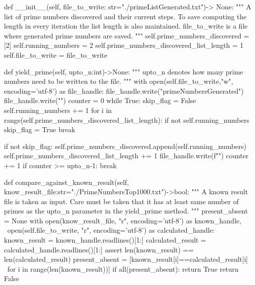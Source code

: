 \documentclass[10pt, twoside]{article}
\begin{document}
\begin{appendices}
\begin{python}
    def __init__(self, file_to_write: str="./primeListGenerated.txt")-> None:
        """
        A list of prime numbers discovered and their current steps. 
        To save computing the length in every iteration the list length is also maintained.
        file_to_write is a file where generated prime numbers are saved.
        """
        self.prime_numbers_discovered = [2]
        self.running_numbers = 2
        self.prime_numbers_discovered_list_length = 1
        self.file_to_write = file_to_write

    def yield_prime(self, upto_n:int)->None:
        """
        upto_n denotes how many prime numbers need to be written to the file.
        """
        with open(self.file_to_write,"w", encoding='utf-8') as file_handle:
            file_handle.write("primeNumbersGenerated")
            file_handle.write("")
            counter = 0
            while True:
                skip_flag = False
                self.running_numbers += 1
                for i in range(self.prime_numbers_discovered_list_length):
                    if not self.running_numbers%
                        skip_flag = True
                        break

                if not skip_flag:
                    self.prime_numbers_discovered.append(self.running_numbers)
                    self.prime_numbers_discovered_list_length += 1
                    file_handle.write(f"")
                    counter += 1
                if counter >= upto_n-1:
                    break

    def compare_against_known_result(self, know_result_file:str="./PrimeNumbersTop1000.txt")->bool:
        """
        A known result file is taken as input. 
        Care must be taken that it has at least same number of primes 
        as the upto_n parameter in the yield_prime method.
        """
        present_absent = None
        with open(know_result_file, "r", encoding='utf-8') as known_handle, \
             open(self.file_to_write, "r", encoding='utf-8') as calculated_handle:
            known_result = known_handle.readlines()[1:]
            calculated_result = calculated_handle.readlines()[1:]
            assert len(known_result) == len(calculated_result)
            present_absent = [known_result[i]==calculated_result[i] \
                              for i in range(len(known_result))]
        if all(present_absent):
            return True
        return False




\end{python}
\end{appendices}
\end{document}
